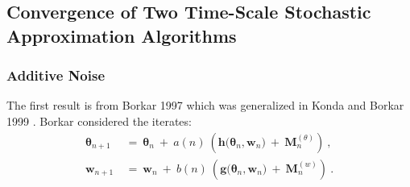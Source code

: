 \documentclass{article}
\newcommand\Bg{\bm{g}}
\newcommand\Bh{\bm{h}}
\newcommand\Bw{\bm{w}}
\newcommand\BM{\bm{M}}
\newcommand\Bth{\bm{\theta}}
\begin{document}
\subsection{Convergence of Two Time-Scale Stochastic Approximation Algorithms}
\label{sec:convergence}

\subsubsection{Additive Noise}
The first result is from Borkar 1997 \cite{Borkar:97}
which was generalized in Konda and Borkar 1999 \cite{Konda:99}.
Borkar considered the iterates:
\begin{align}
\label{eq:iter1Borkar}
\Bth_{n+1} \ &= \ \Bth_n \ + \ a(n) \ \left(\Bh\big(\Bth_n, \Bw_n
               \big) \ + \ \BM^{(\theta)}_{n}\right) \ ,\\
\label{eq:iter2Borkar}
\Bw_{n+1} \ &= \ \Bw_n  \ + \ b(n)\ \left(\Bg\big(\Bth_n, \Bw_n\big) \
              + \ \BM^{(w)}_{n}\right) \ .
\end{align}
\end{document}
